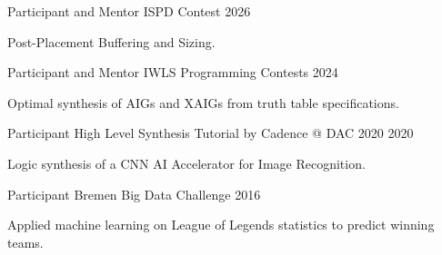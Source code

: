 

\begin{cventries}

  \cventry
    {Participant and Mentor} %
    {ISPD Contest} %
    {} %
    {2026} %
    {
      \begin{cvitems} %
        \item {Post-Placement Buffering and Sizing.}
      \end{cvitems}
    }

  \cventry
    {Participant and Mentor} %
    {IWLS Programming Contests} %
    {} %
    {2024} %
    {
      \begin{cvitems} %
        \item {Optimal synthesis of AIGs and XAIGs from truth table specifications.}
      \end{cvitems}
    }

  \cventry
    {Participant} %
    {High Level Synthesis Tutorial by Cadence @ DAC 2020} %
    {} %
    {2020} %
    {
      \begin{cvitems} %
        \item {Logic synthesis of a CNN AI Accelerator for Image Recognition.}
      \end{cvitems}
    }

  \cventry
    {Participant} %
    {Bremen Big Data Challenge} %
    {} %
    {2016} %
    {
      \begin{cvitems} %
        \item {Applied machine learning on League of Legends statistics to predict winning teams.}
      \end{cvitems}
    }

\end{cventries}
